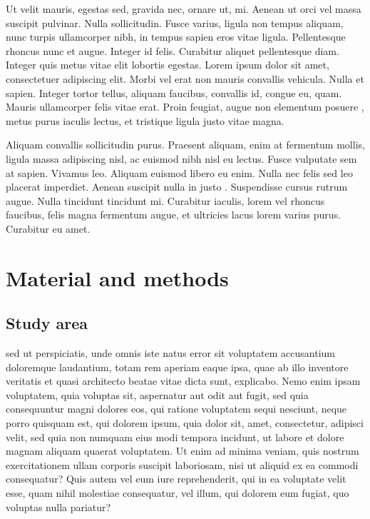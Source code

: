 \documentclass[a4paper,12pt]{article}
\begin{document}
Ut velit mauris, egestas sed, gravida nec, ornare ut, mi. Aenean ut orci vel massa
suscipit pulvinar. Nulla sollicitudin. Fusce varius, ligula non tempus aliquam, nunc
turpis ullamcorper nibh, in tempus sapien eros vitae ligula. Pellentesque rhoncus nunc et
augue. Integer id felis. Curabitur aliquet pellentesque diam. Integer quis metus vitae
elit lobortis egestas. Lorem ipsum dolor sit amet, consectetuer adipiscing elit. Morbi vel
erat non mauris convallis vehicula. Nulla et sapien. Integer tortor tellus, aliquam
faucibus, convallis id, congue eu, quam. Mauris ullamcorper felis vitae erat. Proin
feugiat, augue non elementum posuere \citep{Bullard_1991_MTh}, metus purus iaculis lectus,
et tristique ligula justo vitae magna.

Aliquam convallis sollicitudin purus. Praesent aliquam, enim at fermentum mollis, ligula
massa adipiscing nisl, ac euismod nibh nisl eu lectus. Fusce vulputate sem at
sapien. Vivamus leo. Aliquam euismod libero eu enim. Nulla nec felis sed leo placerat
imperdiet. Aenean suscipit nulla in justo
\citep{Morrison_2006_Bk,Pimlott_1967,Quinn_2003}. Suspendisse cursus rutrum augue. Nulla
tincidunt tincidunt mi. Curabitur iaculis, lorem vel rhoncus faucibus, felis magna
fermentum augue, et ultricies lacus lorem varius purus. Curabitur eu amet.


\section*{Material and methods}


\subsection*{Study area}

\citet{Fournier_1982} sed ut perspiciatis, unde omnis iste natus error sit voluptatem
accusantium doloremque laudantium, totam rem aperiam eaque ipsa, quae ab illo inventore
veritatis et quasi architecto beatae vitae dicta sunt, explicabo. Nemo enim ipsam
voluptatem, quia voluptas sit, aspernatur aut odit aut fugit, sed quia consequuntur magni
dolores eos, qui ratione voluptatem sequi nesciunt, neque porro quisquam est, qui dolorem
ipsum, quia dolor sit, amet, consectetur, adipisci velit, sed quia non numquam eius modi
tempora incidunt, ut labore et dolore magnam aliquam quaerat voluptatem. Ut enim ad minima
veniam, quis nostrum exercitationem ullam corporis suscipit laboriosam, nisi ut aliquid ex
ea commodi consequatur? Quis autem vel eum iure reprehenderit, qui in ea voluptate velit
esse, quam nihil molestiae consequatur, vel illum, qui dolorem eum fugiat, quo voluptas
nulla pariatur? 
\end{document}
